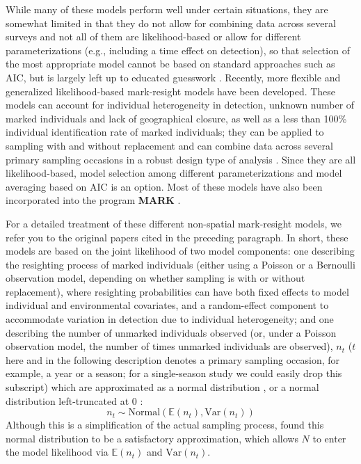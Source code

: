 While many of these models perform well under certain situations, they
are somewhat
limited in that they
do not allow for combining data across
several surveys \citep{mcclintock_etal:2006} and not all of them are
likelihood-based or allow for different parameterizations (e.g., including a time effect on detection), so that
selection of the most appropriate model cannot be based on standard
approaches such as AIC, but is largely left up to educated guesswork
\citep{mcclintock_etal:2006}. Recently, more flexible and generalized
likelihood-based mark-resight models have been developed. These models
can account for individual heterogeneity in detection, unknown number
of marked individuals and lack of geographical closure, as well as a
less than 100\% individual identification rate of marked individuals;
they can be applied to sampling with and without replacement and can
combine data across several primary sampling occasions in a robust
design type of analysis
\citep{mcclintock_etal:2009biometrics,mcclintock_etal:2009mdp}. Since
they are all likelihood-based, model selection among different
parameterizations and model averaging based on AIC is an option. Most
of these models have also been incorporated into the program {\bf MARK}
\citep{mcclintock_white:2010}.

For a detailed treatment of these different non-spatial mark-resight
models, we refer you to the original papers cited in the preceding
paragraph. In short, these models are based on the joint likelihood of
two
model components: one describing the resighting process of
marked individuals (either using a Poisson or a Bernoulli observation
model, depending on whether sampling is with or without replacement),
where resighting probabilities can have both fixed effects to model
individual and environmental covariates, and a random-effect component
to accommodate variation in detection due to individual heterogeneity;
and one describing the number of unmarked individuals observed (or,
under a Poisson observation model, the number of times unmarked
individuals are observed),
$n_t$ ($t$ here and in the following description denotes a primary
sampling occasion, for example, a year or a season; for a
single-season study we could easily drop this subscript) which are
approximated as a normal distribution
\citep{mcclintock_etal:2006}, or a normal distribution left-truncated
at 0 \citep{mcclintock_etal:2009biometrics}:
\[
n_t \sim \mbox{Normal} (\mathbb{E}(n_t), \mbox{Var}(n_t))
\]
Although this is a simplification of the actual sampling process,
\citet{mcclintock_etal:2006} found this normal distribution to be a
satisfactory approximation, which allows $N$ to enter the model
likelihood via $\mathbb{E}(n_t)$ and $\mbox{Var}(n_t)$.

